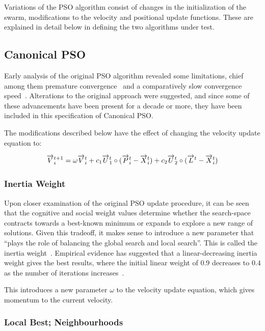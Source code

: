 \documentclass{csfourzero}
\newcommand{\rarrow}[1]{\overrightarrow{#1\vphantom{b}}}
\begin{document}
Variations of the PSO algorithm consist of changes in the initialization of the
swarm, modifications to the velocity and positional update functions. These
are explained in detail below in defining the two algorithms under test.

\subsection{Canonical PSO}

Early analysis of the original PSO algorithm revealed some limitations, chief
among them premature convergence~\cite{vandenBurgh:2002tk} and a comparatively
slow convergence speed~\cite{Shi:1998kl}. Alterations to the original approach
were suggested, and since some of these advancements have been present for a
decade or more, they have been included in this specification of Canonical
PSO\@.

The modifications described below have the effect of changing the velocity
update equation to:

\begin{equation} \label{eq:canon_v_update}
\rarrow{V}_i^{t+1} = \omega \rarrow{V}_i^t + c_1 \rarrow{U}_1^t \circ (\rarrow{P}_i^t - \rarrow{X}_i^t) + c_2 \rarrow{U}^t_2 \circ (\rarrow{L}^t - \rarrow{X}_i^t)
\end{equation}

\subsubsection{Inertia Weight}

Upon closer examination of the original PSO update procedure, it can be seen
that the cognitive and social weight values determine whether the search-space
contracts towards a best-known minimum or expands to explore a new range of
solutions. Given this tradeoff, it makes sense to introduce a new parameter that
``plays the role of balancing the global search and local search''. This is
called the inertia weight~\cite{Shi:1998kl}. Empirical evidence has suggested
that a linear-decreasing inertia weight gives the best results, where the
initial linear weight of $0.9$ decreases to $0.4$ as the number of iterations
increases~\cite{Shi:1998jj}.

This introduces a new parameter $\omega$ to the velocity update equation, which
gives momentum to the current velocity.

\subsubsection{Local Best; Neighbourhoods}
\end{document}

